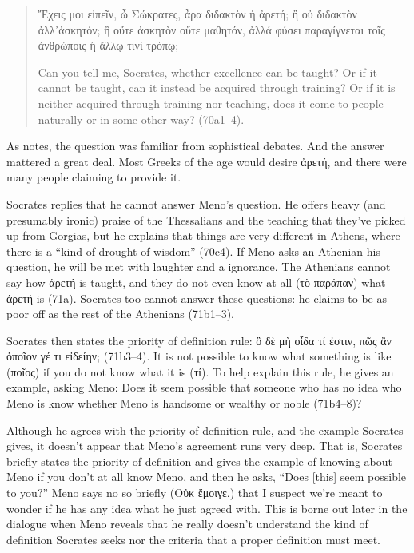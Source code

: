 \documentclass[12pt,letterpaper]{article}
\begin{document}
\begin{quote}
    \begin{greek}Ἔχεις μοι εἰπεῖν, ὦ Σώκρατες, ἆρα διδακτὸν ἡ ἀρετή; ἢ οὐ διδακτὸν ἀλλ᾽ἀσκητόν; ἢ οὔτε ἀσκητὸν οὔτε μαθητόν, ἀλλά φύσει παραγίγνεται τοῖς ἀνθρώποις ἢ ἄλλῳ τινὶ τρόπῳ;\end{greek}

   Can you tell me, Socrates, whether excellence can be taught? Or if it cannot be taught, can it instead be acquired through training? Or if it is neither acquired through training nor teaching, does it come to people naturally or in some other way? (70a1--4).
\end{quote}

As \textcite[4]{nehamas1985} notes, the question was familiar from sophistical debates. And the answer mattered a great deal. Most Greeks of the age would desire \textgreek{ἀρετή}, and there were many people claiming to provide it.

Socrates replies that he cannot answer Meno's question. He offers heavy (and presumably ironic) praise of the Thessalians and the teaching that they've picked up from Gorgias, but he explains that things are very different in Athens, where there is a ``kind of drought of wisdom'' (70c4). If Meno asks an Athenian his question, he will be met with laughter and a ignorance. The Athenians cannot say how \textgreek{ἀρετή} is taught, and they do not even know at all (\textgreek{τὸ παράπαν}) what \textgreek{ἀρετή} is (71a). Socrates too cannot answer these questions: he claims to be as poor off as the rest of the Athenians (71b1--3). 

Socrates then states the priority of definition rule: \textgreek{ὃ δὲ μὴ οἶδα τί ἐστιν, πῶς ἂν ὁποῖον γέ τι εἰδείην;} (71b3--4). It is not possible to know what something is like (\textgreek{ποῖος}) if you do not know what it is (\textgreek{τί}). To help explain this rule, he gives an example, asking Meno: Does it seem possible that someone who has no idea who Meno is know whether Meno is handsome or wealthy or noble (71b4--8)?

Although he agrees with the priority of definition rule, and the example Socrates gives, it doesn't appear that Meno's agreement runs very deep. That is, Socrates briefly states the priority of definition and gives the example of knowing about Meno if you don't at all know Meno, and then he asks, ``Does [this] seem possible to you?'' Meno says no so briefly (\textgreek{Οὐκ ἔμοιγε.}) that I suspect we're meant to wonder if he has any idea what he just agreed with. This is borne out later in the dialogue when Meno reveals that he really doesn't understand the kind of definition Socrates seeks nor the criteria that a proper definition must meet.
\end{document}

